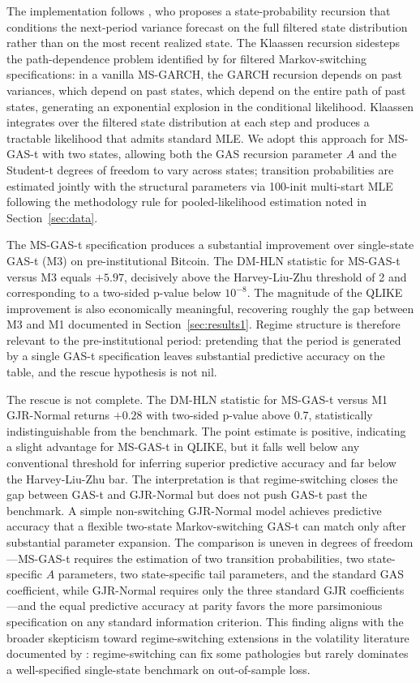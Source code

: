 The implementation follows \citet{klaassen2002}, who proposes a state-probability recursion that conditions the next-period variance forecast on the full filtered state distribution rather than on the most recent realized state. The Klaassen recursion sidesteps the path-dependence problem identified by \citet{hamilton1989} for filtered Markov-switching specifications: in a vanilla MS-GARCH, the GARCH recursion depends on past variances, which depend on past states, which depend on the entire path of past states, generating an exponential explosion in the conditional likelihood. Klaassen integrates over the filtered state distribution at each step and produces a tractable likelihood that admits standard MLE. We adopt this approach for MS-GAS-t with two states, allowing both the GAS recursion parameter $A$ and the Student-t degrees of freedom to vary across states; transition probabilities are estimated jointly with the structural parameters via 100-init multi-start MLE following the methodology rule for pooled-likelihood estimation noted in Section~\ref{sec:data}.

The MS-GAS-t specification produces a substantial improvement over single-state GAS-t (M3) on pre-institutional Bitcoin. The DM-HLN statistic for MS-GAS-t versus M3 equals $+5.97$, decisively above the Harvey-Liu-Zhu threshold of 2 and corresponding to a two-sided p-value below $10^{-8}$. The magnitude of the QLIKE improvement is also economically meaningful, recovering roughly the gap between M3 and M1 documented in Section~\ref{sec:results1}. Regime structure is therefore relevant to the pre-institutional period: pretending that the period is generated by a single GAS-t specification leaves substantial predictive accuracy on the table, and the rescue hypothesis is not nil.

The rescue is not complete. The DM-HLN statistic for MS-GAS-t versus M1 GJR-Normal returns $+0.28$ with two-sided p-value above 0.7, statistically indistinguishable from the benchmark. The point estimate is positive, indicating a slight advantage for MS-GAS-t in QLIKE, but it falls well below any conventional threshold for inferring superior predictive accuracy and far below the Harvey-Liu-Zhu bar. The interpretation is that regime-switching closes the gap between GAS-t and GJR-Normal but does not push GAS-t past the benchmark. A simple non-switching GJR-Normal model achieves predictive accuracy that a flexible two-state Markov-switching GAS-t can match only after substantial parameter expansion. The comparison is uneven in degrees of freedom---MS-GAS-t requires the estimation of two transition probabilities, two state-specific $A$ parameters, two state-specific tail parameters, and the standard GAS coefficient, while GJR-Normal requires only the three standard GJR coefficients---and the equal predictive accuracy at parity favors the more parsimonious specification on any standard information criterion. This finding aligns with the broader skepticism toward regime-switching extensions in the volatility literature documented by \citet{hansen2003}: regime-switching can fix some pathologies but rarely dominates a well-specified single-state benchmark on out-of-sample loss.

